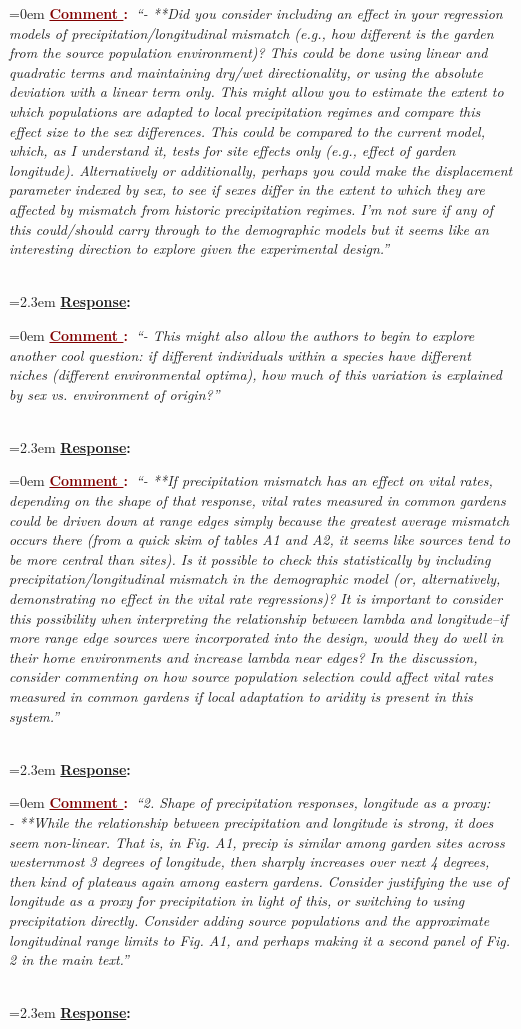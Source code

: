 \documentclass[12pt]{article}
\newcounter{cN}
\newcommand{\comment}[1]{
	\vspace{2em}
	\refstepcounter{cN} %
	\noindent \hangindent=0em \textbf{\textcolor{Maroon}{\uline{Comment \thecN}:~}}\emph{``#1''}
	}
\newcommand{\response}[1]{
	\\[0.25em]
	\hangindent=2.3em \textbf{\textcolor{NavyBlue}{\uline{Response}:~}}#1
	}
\begin{document}
\comment{- **Did you consider including an effect in your regression models of precipitation/longitudinal mismatch (e.g., how different is the garden from the source population environment)? This could be done using linear and quadratic terms and maintaining dry/wet directionality, or using the absolute deviation with a linear term only. This might allow you to estimate the extent to which populations are adapted to local precipitation regimes and compare this effect size to the sex differences. This could be compared to the current model, which, as I understand it, tests for site effects only (e.g., effect of garden longitude). Alternatively or additionally, perhaps you could make the displacement parameter indexed by sex, to see if sexes differ in the extent to which they are affected by mismatch from historic precipitation regimes. I'm not sure if any of this could/should carry through to the demographic models but it seems like an interesting direction to explore given the experimental design.}
\response{}
	
\comment{- This might also allow the authors to begin to explore another cool question: if different individuals within a species have different niches (different environmental optima), how much of this variation is explained by sex vs. environment of origin?}
\response{}
	
\comment{- **If precipitation mismatch has an effect on vital rates, depending on the shape of that response, vital rates measured in common gardens could be driven down at range edges simply because the greatest average mismatch occurs there (from a quick skim of tables A1 and A2, it seems like sources tend to be more central than sites). Is it possible to check this statistically by including precipitation/longitudinal mismatch in the demographic model (or, alternatively, demonstrating no effect in the vital rate regressions)? It is important to consider this possibility when interpreting the relationship between lambda and longitude--if more range edge sources were incorporated into the design, would they do well in their home environments and increase lambda near edges? In the discussion, consider commenting on how source population selection could affect vital rates measured in common gardens if local adaptation to aridity is present in this system.}
\response{}

\comment{2. Shape of precipitation responses, longitude as a proxy:
	\\
	- **While the relationship between precipitation and longitude is strong, it does seem non-linear. That is, in Fig. A1, precip is similar among garden sites across westernmost 3 degrees of longitude, then sharply increases over next 4 degrees, then kind of plateaus again among eastern gardens. Consider justifying the use of longitude as a proxy for precipitation in light of this, or switching to using precipitation directly. Consider adding source populations and the approximate longitudinal range limits to Fig. A1, and perhaps making it a second panel of Fig. 2 in the main text.}
\response{}
\end{document}

